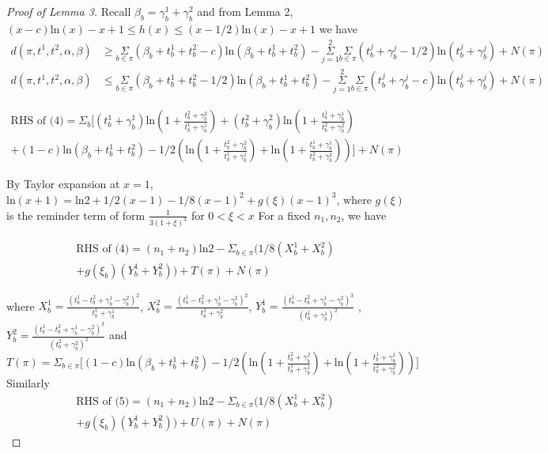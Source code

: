 \documentclass[aoas,preprint]{imsart}
\begin{document}
\begin{proof}[Proof of Lemma 3]
Recall $\beta_b = \gamma_b^1 + \gamma_b^2$ and from Lemma 2, $(x - c)\text{ln}(x) - x + 1 \leq h(x) \leq (x - 1/2)\text{ln}(x) - x + 1$ we have 
\begin{align}
d(\pi, t^1, t^2, \alpha, \beta) &\geq \underset{b\in \pi}\Sigma (\beta_b + t_b^1 + t_b^2 - c) \text{ln}(\beta_b  + t_b^1 + t_b^2) - \overset{2}{\underset{j = 1}{\Sigma}}\underset{b\in\pi}\Sigma (t_b^j + \gamma_b^j - 1/2) \text{ln}(t_b^j + \gamma_b^j) + N(\pi)\\
d(\pi, t^1, t^2, \alpha, \beta) &\leq \underset{b\in \pi}\Sigma (\beta_b + t_b^1 + t_b^2 - 1 / 2) \text{ln}(\beta_b  + t_b^1 + t_b^2) - \overset{2}{\underset{j = 1}{\Sigma}}\underset{b\in\pi}\Sigma (t_b^j + \gamma_b^j - c) \text{ln}(t_b^j + \gamma_b^j) + N(\pi)
\end{align}


\begin{eqnarray*}
\text{RHS of (4)} = \Sigma_b \big[ (t_b^1 + \gamma_b^1) \text{ln}(1 + \frac{t_b^2 + \gamma_b^2}{t_b^1 + \gamma_b^1})
 + (t_b^2 + \gamma_b^2) \text{ln}(1 + \frac{t_b^1 + \gamma_b^1}{t_b^2 + \gamma_b^2})\\
 + (1 - c) \text{ln}(\beta_b + t_b^1 + t_b^2) 
  - 1/2(\text{ln}(1 + \frac{t_b^2 + \gamma_b^2}{t_b^1 + \gamma_b^1}) + \text{ln}(1 + \frac{t_b^1 + \gamma_b^1}{t_b^2 + \gamma_b^2}))\big] + N(\pi)
\end{eqnarray*}

By Taylor expansion at $x= 1$, $\text{ln}(x + 1) = \text{ln}2 + 1/2(x - 1) - 1/8(x - 1)^2 + g(\xi) (x - 1)^3$, where $g(\xi)$ is the reminder term of form $\frac{1}{3(1+\xi)^3}$ for $ 0 < \xi < x$
For a fixed $n_1, n_2$, we have 

\begin{eqnarray*}
\text{RHS of (4)} = (n_1 + n_2) \text{ln}2  - \Sigma_{b\in\pi}(1/8 (X_b^1 + X_b^2)\\
+ g(\xi_b) (Y_b^1 + Y_b^2) )+ T(\pi) + N(\pi)
\end{eqnarray*}

where $X_b^1 = \frac{(t_b^1 - t_b^2 + \gamma_b^1 - \gamma_b^2)^2}{t_b^1 + \gamma_b^1}$, $X_b^2 =  \frac{(t_b^1 - t_b^2 + \gamma_b^1 - \gamma_b^2)^2}{t_b^2 + \gamma_b^2}$,
$Y_b^1 = \frac{(t_b^1 - t_b^2 + \gamma_b^1 - \gamma_b^2)^3}{(t_b^1 + \gamma_b^1)^2} $ , $Y_b^2 =  \frac{(t_b^1 - t_b^2 + \gamma_b^1 - \gamma_b^2)^3}{(t_b^2 + \gamma_b^2)^2}$
and $T(\pi) = \Sigma_{b\in\pi}\big[(1 - c) \text{ln}(\beta_b + t_b^1 + t_b^2) 
  - 1/2(\text{ln}(1 + \frac{t_b^2 + \gamma_b^2}{t_b^1 + \gamma_b^1}) + \text{ln}(1 + \frac{t_b^1 + \gamma_b^1}{t_b^2 + \gamma_b^2}))\big]$\\
Similarly
\begin{eqnarray*}
\text{RHS of (5)} = (n_1 + n_2) \text{ln}2  -\Sigma_{b\in\pi}(1/8 (X_b^1 + X_b^2)\\
+ g(\xi_b) (Y_b^1 + Y_b^2)) + U(\pi) + N(\pi)
\end{eqnarray*}
  

\end{proof}
\end{document}
